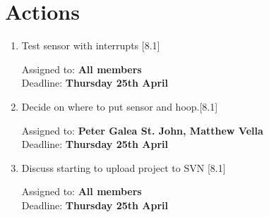 \documentclass[11pt,a4paper]{article}
\begin{document}
\section*{Actions}

\begin{enumerate}

\item Test sensor with interrupts [8.1]
\begin{flushright}
	Assigned to: \textbf{All members} \\
	Deadline: \textbf{Thursday 25th April}
\end{flushright}

\item Decide on where to put sensor and hoop.[8.1]
\begin{flushright}
	Assigned to: \textbf{Peter Galea St. John, Matthew Vella} \\
	Deadline: \textbf{Thursday 25th April}
\end{flushright}

\item Discuss starting to upload project to SVN [8.1]
\begin{flushright}
	Assigned to: \textbf{All members} \\
	Deadline: \textbf{Thursday 25th April}
\end{flushright}

\end{enumerate}	
\end{document}
